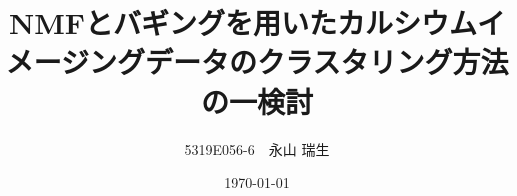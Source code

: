 \documentclass[
  twoside, %
  numbers=noenddot, %
  headsepline, %
  footsepline, %
]{scrbook}
\title{NMFとバギングを用いたカルシウムイメージングデータのクラスタリング方法の一検討}
\author{5319E056-6　永山 瑞生}
\date{\today}
\begin{document}
\frontmatter
\maketitle

\tableofcontents

\mainmatter










\backmatter
\begin{otherlanguage}{english}
  \printbibliography[title=参考文献]
\end{otherlanguage}


\clearpage

\end{document}
